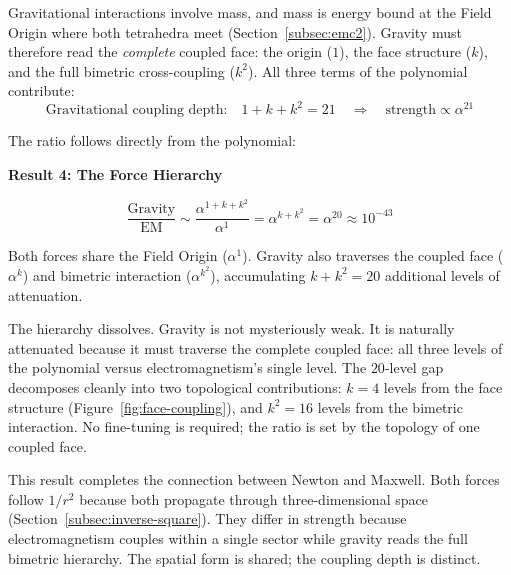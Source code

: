 \documentclass[aps,prd,preprint,superscriptaddress,showpacs,preprintnumbers,amsmath,amssymb,nofootinbib]{revtex4-2}
\begin{document}
Gravitational interactions involve mass, and mass is energy bound at the Field Origin where both tetrahedra meet (Section~\ref{subsec:emc2}). Gravity must therefore read the \emph{complete} coupled face: the origin ($1$), the face structure ($k$), and the full bimetric cross-coupling ($k^2$). All three terms of the polynomial contribute:
\begin{equation}
\text{Gravitational coupling depth:} \quad 1 + k + k^2 = 21 \quad \Rightarrow \quad \text{strength} \propto \alpha^{21}
\label{eq:grav-depth}
\end{equation}

The ratio follows directly from the polynomial:

\vspace{1.5em}
\noindent
\colorbox{resultgreen}{\parbox{\dimexpr\textwidth-2\fboxsep\relax}{%
\vspace{0.8em}
\centering
\textbf{\large Result 4: The Force Hierarchy}

\vspace{0.5em}
\boldmath
\begin{equation}
\frac{\text{Gravity}}{\text{EM}} \sim \frac{\alpha^{1+k+k^2}}{\alpha^{1}} = \alpha^{k+k^2} = \alpha^{20} \approx 10^{-43}
\label{eq:force-hierarchy}
\end{equation}
\unboldmath

\vspace{0.3em}
Both forces share the Field Origin ($\alpha^1$). Gravity also traverses the coupled face ($\alpha^k$) and bimetric interaction ($\alpha^{k^2}$), accumulating $k + k^2 = 20$ additional levels of attenuation.
\vspace{0.5em}
}}
\vspace{1cm}

The hierarchy dissolves. Gravity is not mysteriously weak. It is naturally attenuated because it must traverse the complete coupled face: all three levels of the polynomial versus electromagnetism's single level. The $20$-level gap decomposes cleanly into two topological contributions: $k = 4$ levels from the face structure (Figure~\ref{fig:face-coupling}), and $k^2 = 16$ levels from the bimetric interaction. No fine-tuning is required; the ratio is set by the topology of one coupled face.

This result completes the connection between Newton and Maxwell. Both forces follow $1/r^2$ because both propagate through three-dimensional space (Section~\ref{subsec:inverse-square}). They differ in strength because electromagnetism couples within a single sector while gravity reads the full bimetric hierarchy. The spatial form is shared; the coupling depth is distinct.
\end{document}
